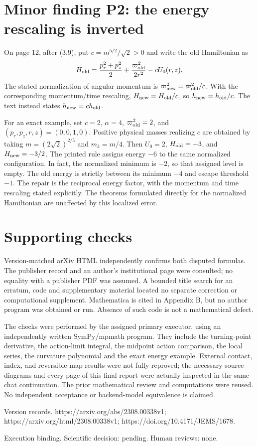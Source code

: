 \documentclass[10pt]{article}
\begin{document}
\section*{Minor finding P2: the energy rescaling is inverted}
On page 12, after (3.9), put \(c=m^{5/2}/\sqrt2>0\) and write the old Hamiltonian as \[H_{\rm old}=\frac{p_r^2+p_z^2}{2}
   +\frac{\varpi_{\rm old}^2}{2r^2}-cU_0(r,z).\] The stated normalization of angular momentum is \(\varpi_{\rm new}^2=\varpi_{\rm old}^2/c\). With the corresponding momentum/time rescaling, \(H_{\rm new}=H_{\rm old}/c\), so \(h_{\rm new}=h_{\rm old}/c\). The text instead states \(h_{\rm new}=c h_{\rm old}\).\par
For an exact example, set \(c=2\), \(\alpha=4\), \(\varpi_{\rm old}^2=2\), and \((p_r,p_z,r,z)=(0,0,1,0)\). Positive physical masses realizing \(c\) are obtained by taking \(m=(2\sqrt2)^{2/5}\) and \(m_3=m/4\). Then \(U_0=2\), \(H_{\rm old}=-3\), and \(H_{\rm new}=-3/2\). The printed rule assigns energy \(-6\) to the same normalized configuration. In fact, the normalized minimum is \(-2\), so that assigned level is empty. The old energy is strictly between its minimum \(-4\) and escape threshold \(-1\). The repair is the reciprocal energy factor, with the momentum and time rescaling stated explicitly. The theorems formulated directly for the normalized Hamiltonian are unaffected by this localized error.\par
\section*{Supporting checks}
Version-matched arXiv HTML independently confirms both disputed formulas. The publisher record and an author’s institutional page were consulted; no equality with a publisher PDF was assumed. A bounded title search for an erratum, code and supplementary material located no separate correction or computational supplement. Mathematica is cited in Appendix B, but no author program was obtained or run. Absence of such code is not a mathematical defect.\par
The checks were performed by the assigned primary executor, using an independently written SymPy/mpmath program. They include the turning-point derivative, the action-limit integral, the midpoint action comparison, the local series, the curvature polynomial and the exact energy example. External contact, index, and reversible-map results were not fully reproved; the necessary source diagrams and every page of this final report were actually inspected in the same-chat continuation. The prior mathematical review and computations were reused. No independent acceptance or backend-model equivalence is claimed.\par
Version records. https://arxiv.org/abs/2308.00338v1; https://arxiv.org/html/2308.00338v1; https://doi.org/10.4171/JEMS/1678.\par
Execution binding. Scientific decision: pending. Human reviews: none.\par
\end{document}
